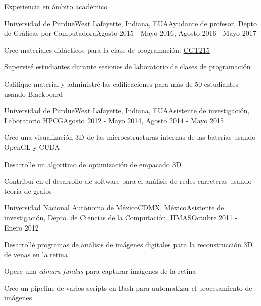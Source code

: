 \documentclass{resume} %
\begin{document}
\begin{rSection}{Experiencia en ámbito académico}

	\begin{rSubsection}{\href{http://www.purdue.edu}{Universidad de Purdue}}{West Lafayette, Indiana, EUA}{Ayudante de profesor, Depto de Gráficas por Computadora}{Agosto 2015 - Mayo 2016, Agosto 2016 - Mayo 2017}
	\item Cree materiales didácticos para la clase de programación: \href{https://polytechnic.purdue.edu/sites/default/files/CGT-fall-2017.pdf}{CGT215}
	\item Supervisé estudiantes durante sesiones de laboratorio de clases de programación
	\item Califique material y administré las calificaciones para más de 50 estudiantes usando Blackboard
	\end{rSubsection}

	\begin{rSubsection}{\href{http://www.purdue.edu}{Universidad de Purdue}}{West Lafayette, Indiana, EUA}{Asistente de investigación, \href{http://hpcg.purdue.edu/}{Laboratorio HPCG}}{Agosto 2012 - Mayo 2014, Agosto 2014 - Mayo 2015}
	\item Cree una visualización 3D de las microestructuras internas de las baterías usando OpenGL y CUDA
	\item Desarrolle un algoritmo de optimización de empacado 3D
	\item Contribuí en el desarrollo de software para el análisis de redes carreteras usando teoría de grafos
	\end{rSubsection}
	
	\begin{rSubsection}{\href{http://www.unam.mx}{Universidad Nacional Autónoma de México}}{CDMX, México}{Asistente de investigación, \href{https://turing.iimas.unam.mx/}{Depto. de Ciencias de la Computación}, \href{https://www.iimas.unam.mx/}{IIMAS}}{Octubre 2011 - Enero 2012}
	\item Desarrollé programas de análisis de imágenes digitales para la reconstrucción 3D de venas en la retina
	\item Opere una \emph{cámara fundus} para capturar imágenes de la retina
	\item Cree un pipeline de varios scripts en Bash para automatizar el procesamiento de imágenes
	\end{rSubsection}
	

\end{rSection}
\end{document}
